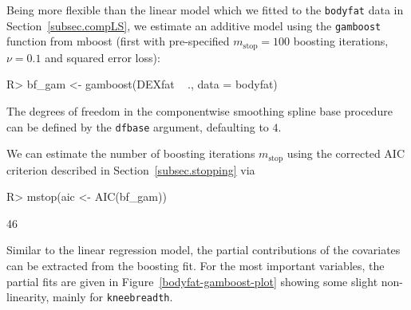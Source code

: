 \documentclass{article}
\newcommand{\Rpackage}[1]{{\normalfont\fontseries{b}\selectfont #1}}
\newcommand{\Robject}[1]{\texttt{#1}}
\newcommand{\Rcmd}[1]{\texttt{#1}}
\newenvironment{Schunk}{}{}
\begin{document}

Being more flexible than the linear model which we fitted to the
\Robject{bodyfat} data in Section~\ref{subsec.compLS}, we estimate an additive
model 
using the \Rcmd{gamboost} function from \Rpackage{mboost} (first with
pre-specified $m_\text{stop} = 100$ 
boosting iterations, $\nu = 0.1$ and squared error loss):
\begin{Schunk}
\begin{Sinput}
R> bf_gam <- gamboost(DEXfat ~ ., data = bodyfat)
\end{Sinput}
\end{Schunk}
The degrees of freedom in the componentwise smoothing spline base procedure
can be defined by the \Rcmd{dfbase} argument, defaulting to $4$.  

We can estimate the number of boosting iterations $m_\text{stop}$
using the corrected AIC criterion described in
Section~\ref{subsec.stopping}
via
\begin{Schunk}
\begin{Sinput}
R> mstop(aic <- AIC(bf_gam))
\end{Sinput}
\begin{Soutput}
[1] 46
\end{Soutput}
\end{Schunk}
Similar to the linear regression model, the partial contributions of the covariates
can be extracted from the boosting fit. For the most important variables, 
the partial fits are given in Figure~\ref{bodyfat-gamboost-plot} showing some 
slight non-linearity, mainly for \Robject{kneebreadth}. 

\end{document}

